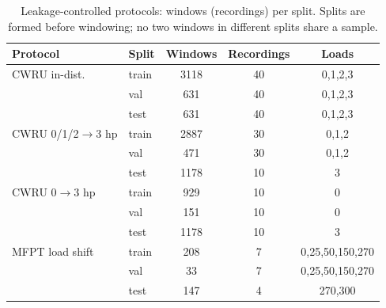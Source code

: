 \begin{table}[t]
\caption{Leakage-controlled protocols: windows (recordings) per split. Splits are formed before windowing; no two windows in different splits share a sample.}
\label{tab:protocols}
\centering
\footnotesize
\begin{tabular}{llccc}
\toprule
Protocol & Split & Windows & Recordings & Loads \\
\midrule
CWRU in-dist. & train & 3118 & 40 & 0,1,2,3 \\
 & val & 631 & 40 & 0,1,2,3 \\
 & test & 631 & 40 & 0,1,2,3 \\
\midrule
CWRU 0/1/2$\to$3 hp & train & 2887 & 30 & 0,1,2 \\
 & val & 471 & 30 & 0,1,2 \\
 & test & 1178 & 10 & 3 \\
\midrule
CWRU 0$\to$3 hp & train & 929 & 10 & 0 \\
 & val & 151 & 10 & 0 \\
 & test & 1178 & 10 & 3 \\
\midrule
MFPT load shift & train & 208 & 7 & 0,25,50,150,270 \\
 & val & 33 & 7 & 0,25,50,150,270 \\
 & test & 147 & 4 & 270,300 \\
\bottomrule
\end{tabular}
\end{table}
